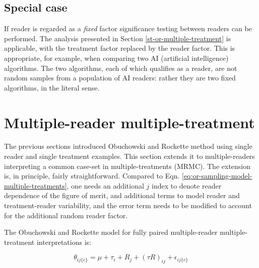 \documentclass[
]{book}
\begin{document}
\hypertarget{st-or-multiple-reader-example-three}{%
\subsection{Special case}\label{st-or-multiple-reader-example-three}}

If reader is regarded as a \emph{fixed} factor significance testing between readers can be performed. The analysis presented in Section \ref{st-or-multiple-treatment} is applicable, with the treatment factor replaced by the reader factor. This is appropriate, for example, when comparing two AI (artificial intelligence) algorithms. The two algorithms, each of which qualifies as a reader, are not random samples from a population of AI readers: rather they are two fixed algorithms, in the literal sense.

\hypertarget{or-method-intro-multiple-reader-multiple-treatment}{%
\section{Multiple-reader multiple-treatment}\label{or-method-intro-multiple-reader-multiple-treatment}}

The previous sections introduced Obuchowski and Rockette method using single reader and single treatment examples. This section extends it to multiple-readers interpreting a common case-set in multiple-treatments (MRMC). The extension is, in principle, fairly straightforward. Compared to Eqn. \eqref{eq:or-sampling-model-multiple-treatments}, one needs an additional \(j\) index to denote reader dependence of the figure of merit, and additional terms to model reader and treatment-reader variability, and the error term needs to be modified to account for the additional random reader factor.

The Obuchowski and Rockette model for fully paired multiple-reader multiple-treatment interpretations is:

\begin{equation}
\theta_{ij\{c\}}=\mu+\tau_i+R_j+(\tau R)_{ij}+\epsilon_{ij\{c\}}
\label{eq:or-sampling-model-general}
\end{equation}
\end{document}
